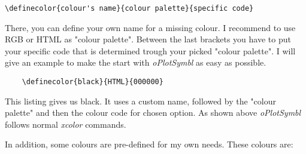\documentclass[a4paper,parskip=half,bibtotoc,11pt]{scrartcl}
\begin{document}
\begin{lstlisting}
\definecolor{colour's name}{colour palette}{specific code}
\end{lstlisting}

There, you can define your own name for a missing colour. I recommend to use RGB or HTML as "colour palette". Between the last brackets you have to put your specific code that is determined trough your picked  "colour palette". I will give an example to make the start with \textit{oPlotSymbl} as easy as possible. 

\begin{lstlisting}
	\definecolor{black}{HTML}{000000}
\end{lstlisting}

This listing gives us black. It uses a custom name, followed by the "colour palette" and then the colour code for chosen option. As shown above \textit{oPlotSymbl} follows normal \textit{xcolor} \cite{xcolor} commands.
  
In addition, some colours are pre-defined for my own needs. These colours are:
\end{document}
